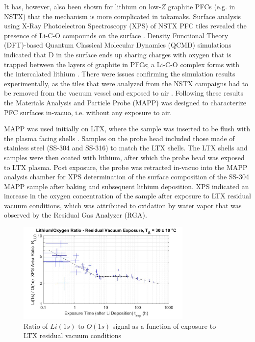 \documentclass[%
 aip,
 amsmath,amssymb,
 reprint,%
]{revtex4-1}
\begin{document}
It has, however, also been shown for lithium on low-$Z$ graphite PFCs (e.g. in NSTX) that the mechanism is more complicated in tokamaks. Surface analysis using X-Ray Photoelectron Spectroscopy (XPS) of NSTX PFC tiles revealed the presence of Li-C-O compounds on the surface \cite{bob-lucia}. Density Functional Theory (DFT)-based Quantum Classical Molecular Dynamics (QCMD) simulations indicated that D in the surface ends up sharing charges  with  oxygen  that  is  trapped between the layers of graphite in PFCs; a Li-C-O complex forms with the intercalated lithium \cite{krstic}. There were issues confirming the simulation results experimentally, as the tiles that were analyzed from the NSTX campaigns had to be removed from the vacuum vessel and exposed to air  \cite{bob-lucia}. Following these results the Materials Analysis and Particle Probe (MAPP) was designed to characterize PFC surfaces in-vacuo, i.e. without any exposure to air.

MAPP was used initially on LTX, where the sample was inserted to be flush with    the  plasma  facing  shells  \cite{lucia-paper, lucia-thesis}.   Samples  on  the  probe  head  included those  made of stainless steel (SS-304 and SS-316) to match the LTX shells. The LTX shells and samples were then coated with lithium, after which the probe head was exposed to LTX plasma. Post exposure, the probe was retracted in-vacuo into the MAPP analysis chamber for XPS determination of the surface composition of the SS-304 MAPP sample after baking and subsequent lithium deposition. XPS indicated an increase in the oxygen concentration  of the sample after exposure to LTX residual vacuum conditions, which was attributed to oxidation by water vapor that was observed by the Residual Gas Analyzer (RGA).

\begin{figure}%
\centering
\includegraphics[width=3.37in,keepaspectratio]{Ratio}%
\caption{Ratio of $Li(1s)$ to $O(1s)$ signal as a function of exposure to LTX residual vacuum conditions \cite{bob-lucia}}
\end{figure}
\end{document}

